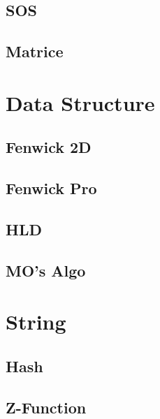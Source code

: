 \subsection{SOS}
\raggedbottom
\subsection{Matrice}
\raggedbottom
\hrulefill


\section{Data Structure}
\subsection{Fenwick 2D}
\raggedbottom
\subsection{Fenwick Pro}
\raggedbottom
\subsection{HLD}
\raggedbottom
\subsection{MO's Algo}
\raggedbottom
\hrulefill

\section{String}
\subsection{Hash}
\raggedbottom
\subsection{Z-Function}
\raggedbottom

